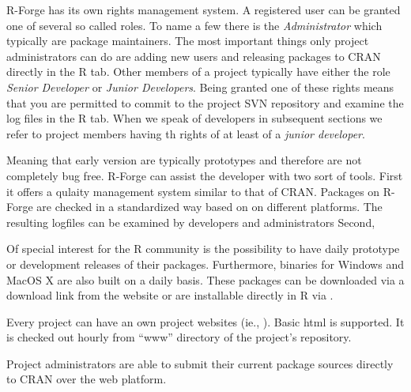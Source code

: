 R-Forge has its own rights management system. A registered user can be
granted one of several so called roles. To name a few there is
the \textit{Administrator} which typically are package
maintainers. The most important things only project administrators can do
are adding new users and releasing packages to CRAN directly in the R
tab. Other members of a project typically have either the role \textit{Senior
Developer} or \textit{Junior Developers}. Being granted one of these
rights means that you are permitted to commit to the project
SVN repository and examine 
the log files in the R tab.
When we speak of developers in subsequent sections we refer to project
members having th rights of at least of a \textit{junior developer}.

Meaning that early version are typically prototypes and therefore are
not completely bug free. R-Forge can assist the developer with two
sort of tools. First it offers a qulaity management system similar to
that of CRAN. Packages on R-Forge are checked in a
standardized way based on  on different
platforms. The resulting logfiles can be examined by developers and
administrators  Second, 

Of special interest for the R community is the possibility to have
daily prototype or development releases
of their packages. Furthermore, binaries for Windows and MacOS X are
also built on a daily basis. These packages can be
downloaded via a download link from the website or are installable
directly in R via . 

Every project can have an own project websites (ie.,
). Basic html is
supported. It is checked out hourly from ``www'' directory of the
project's repository.

Project administrators are able to submit their current package
sources directly to CRAN over the web platform. 









